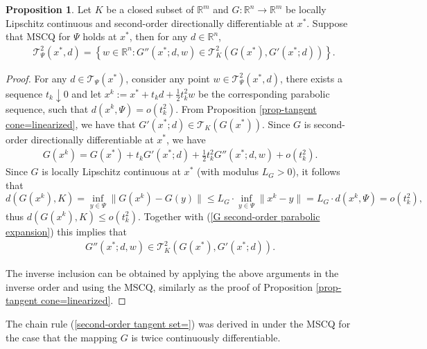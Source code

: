 \documentclass[11pt]{article}
\theoremstyle{definition}
\newtheorem{proposition}[theorem]{Proposition}
\theoremstyle{remark}
\numberwithin{equation}{section}
\begin{document}
 \begin{proposition}\label{prop-second-order tangent cone=linearized}
   Let $K$ be a closed subset of $\mathbb{R}^m$ and
 $G:\mathbb{R}^n\to \mathbb{R}^m$ be locally Lipschitz continuous and second-order directionally
 differentiable at $x^*$. Suppose that MSCQ for $\Psi$ holds at $x^*$, then for any $d\in \mathbb{R}^n$,
  \begin{align}\label{second-order tangent set=}
   &\mathcal{T}^2_{\Psi}(x^*,d)=\left\{w\in \mathbb{R}^n:G''(x^*;d,w)\in
   \mathcal{T}_{K}^2(G(x^*),G'(x^*;d))\right\}.
  \end{align}
\end{proposition}
\begin{proof}
 For any $d\in \mathcal{T}_{\Psi}(x^*)$, consider any point $w\in \mathcal{T}^2_{\Psi}(x^*,d)$, there exists a sequence $t_k\downarrow 0$ and let
  $x^k:=x^*+t_k d+\frac{1}{2}t_k^2w$ be the corresponding parabolic sequence, such that
  $d(x^k,\Psi)=o(t_k^2)$. From Proposition \ref{prop-tangent
  cone=linearized}, we have that
  $G'(x^*;d)\in \mathcal{T}_{K}(G(x^*))$. Since $G$ is second-order directionally differentiable at $x^*$, we have
  \begin{align}\label{G second-order parabolic expansion}
    G(x^k)=G(x^*)+t_k G'(x^*;d)+\frac{1}{2}t_k^2G''(x^*;d,w)+o(t_k^2).
  \end{align}
  Since $G$ is locally Lipschitz continuous at $x^*$
 (with modulus $L_G>0$), it follows that
  $$d(G(x^k),K)=\inf_{y\in\Psi}\|G(x^k)-G(y)\|\le L_G\cdot\inf_{y\in\Psi}\|x^k-y\|=L_G\cdot d(x^k,\Psi)=o(t_k^2),$$
  thus $d(G(x^k),K)\le o(t_k^2)$.
   Together with (\ref{G second-order parabolic expansion}) this implies that
  \begin{align}\label{G-second-order tangent set}
   G''(x^*;d,w)\in \mathcal{T}_{K}^2(G(x^*),G'(x^*;d)).
  \end{align}

The inverse inclusion can be obtained by applying the above arguments in the inverse order and using the MSCQ, similarly as the proof of  Proposition \ref{prop-tangent cone=linearized}.
\end{proof}

The chain rule (\ref{second-order tangent set=}) was derived in \cite[Lemma 2.5]{Mehlitz 20} under the MSCQ for the case that the mapping $G$ is  twice continuously differentiable.
\end{document}
